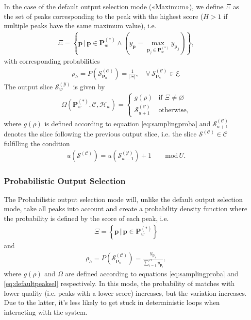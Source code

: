 In the case of the default output selection mode («Maximum»), we define $\Xi$ as the set of peaks corresponding to the peak with the highest score ($H>1$ if multiple peaks have the same maximum value), i.e.
	\begin{align}
		\Xi = \left\lbrace \bm p \,\bigg\vert	\, \bm p \in \bm P^{(\ast)}_w \wedge \left( y_{\bm p} = \max_{\bm p_j \in \bm P^{(\ast)}_w} y_{\bm p_j}\right)\right\rbrace,
	\end{align}
	with corresponding probabilities
	\begin{align}\label{eq:max-rho}
		\rho_h = P\left(\mathcal S^{(\mathcal C)}_{\bm p_h}\right) = \frac{1}{\left\lvert \Xi \right\rvert}, \quad \forall \,\mathcal S^{(\mathcal C)}_{\bm p_h} \in \xi.
	\end{align}
	The output slice $\mathcal S^{(\mathcal Y)}_w$ is given by
	\begin{align}\label{eq:defaultpeaksel}
		\Omega\left(\bm P^{(\ast)}_w, \mathcal C, \mathcal H_w\right)
		= \left\lbrace\begin{array}{ll}
			g(\rho) & \text{if } \Xi \ne \varnothing\\
			\mathcal S^{(\mathcal C)}_{u+1} & \text{otherwise},
		\end{array}\right.
	\end{align}
	where $g(\rho)$ is defined according to equation \ref{eq:samplingproba} and $\mathcal S^{(\mathcal C)}_{u+1}$ denotes the slice following the previous output slice, i.e. the slice $\mathcal S^{(\mathcal C)}\in \mathcal C$ fulfilling the condition
	\begin{align}\label{eq:defaultpeaksel-emptycase}
		u\left(\mathcal S^{(\mathcal C)}\right) = u\left(\mathcal S^{(\mathcal Y)}_{w-1}\right) + 1 \qquad \text{mod}\, U.
	\end{align}
	

\subsubsection{Probabilistic Output Selection}\label{ssec:proba-output-sel}
The Probabilistic output selection mode will, unlike the default output selection mode, take all peaks into account and create a probability density function where the probability is defined by the score of each peak, i.e.
	\begin{align}
		\Xi = \left\lbrace \bm p \, \bigg\vert \, \bm p \in \bm P^{(\ast)}_w\right\rbrace
	\end{align}
	and
	\begin{align}\label{eq:proba-rho}
		\rho_h = P\left(\mathcal S^{(\mathcal C)}_{\bm p_h}\right) = \frac{y_{\bm p_h}}{\sum_{i = 1}^H y_{\bm p_i}},
	\end{align}
	where $g(\rho)$ and $\Omega$ are defined according to equations \ref{eq:samplingproba} and \ref{eq:defaultpeaksel} respectively. In this mode, the probability of matches with lower quality (i.e. peaks with a lower score) increases, but the variation increases. Due to the latter, it's less likely to get stuck in deterministic loops when interacting with the system.

